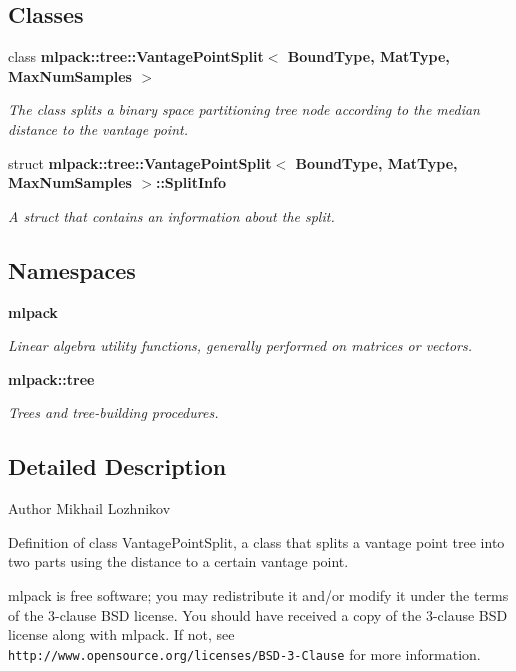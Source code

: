 \subsection*{Classes}
\begin{DoxyCompactItemize}
\item 
class {\bf mlpack\+::tree\+::\+Vantage\+Point\+Split$<$ Bound\+Type, Mat\+Type, Max\+Num\+Samples $>$}
\begin{DoxyCompactList}\small\item\em The class splits a binary space partitioning tree node according to the median distance to the vantage point. \end{DoxyCompactList}\item 
struct {\bf mlpack\+::tree\+::\+Vantage\+Point\+Split$<$ Bound\+Type, Mat\+Type, Max\+Num\+Samples $>$\+::\+Split\+Info}
\begin{DoxyCompactList}\small\item\em A struct that contains an information about the split. \end{DoxyCompactList}\end{DoxyCompactItemize}
\subsection*{Namespaces}
\begin{DoxyCompactItemize}
\item 
 {\bf mlpack}
\begin{DoxyCompactList}\small\item\em Linear algebra utility functions, generally performed on matrices or vectors. \end{DoxyCompactList}\item 
 {\bf mlpack\+::tree}
\begin{DoxyCompactList}\small\item\em Trees and tree-\/building procedures. \end{DoxyCompactList}\end{DoxyCompactItemize}


\subsection{Detailed Description}
\begin{DoxyAuthor}{Author}
Mikhail Lozhnikov
\end{DoxyAuthor}
Definition of class Vantage\+Point\+Split, a class that splits a vantage point tree into two parts using the distance to a certain vantage point.

mlpack is free software; you may redistribute it and/or modify it under the terms of the 3-\/clause B\+SD license. You should have received a copy of the 3-\/clause B\+SD license along with mlpack. If not, see {\tt http\+://www.\+opensource.\+org/licenses/\+B\+S\+D-\/3-\/\+Clause} for more information. 
